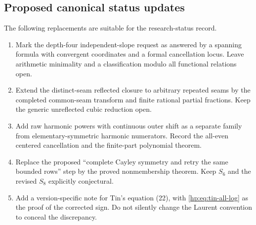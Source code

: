 \subsection{Proposed canonical status updates}

The following replacements are suitable for the research-status record.
\begin{enumerate}
\item Mark the depth-four independent-slope request as answered by a
spanning formula with convergent coordinates and a formal cancellation
locus. Leave arithmetic minimality and a classification modulo all
functional relations open.
\item Extend the distinct-seam reflected closure to arbitrary repeated
seams by the completed common-seam transform and finite rational
partial fractions. Keep the generic unreflected cubic reduction open.
\item Add raw harmonic powers with continuous outer shift as a separate
family from elementary-symmetric harmonic numerators. Record the
all-even centered cancellation and the finite-part polynomial theorem.
\item Replace the proposed ``complete Cayley symmetry and retry the
same bounded rows'' step by the proved nonmembership theorem. Keep
$S_6$ and the revised $S_8$ explicitly conjectural.
\item Add a version-specific note for Tin's equation (22), with
\eqref{hp:eq:tin-all-log} as the proof of the corrected sign. Do not
silently change the Laurent convention to conceal the discrepancy.
\end{enumerate}
